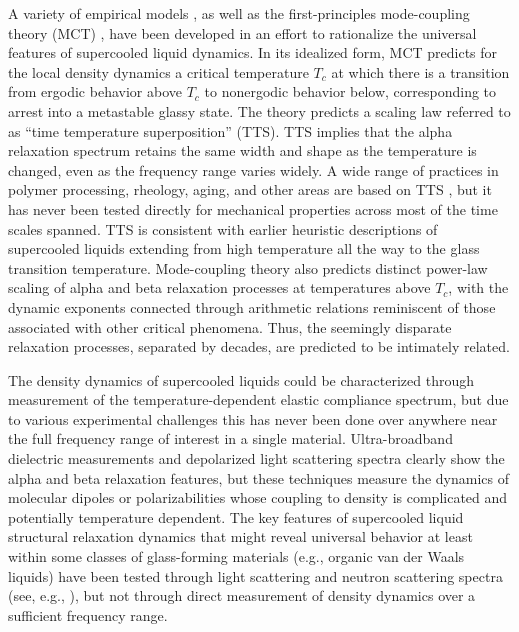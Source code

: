 \documentclass[reprint,showpacs,amsmath,amssymb,aip,jcp]{revtex4-1}
\begin{document}
A variety of empirical models \cite{Dyre2006a, Gibbs1958, Cohen1979,
  Kivelson1995, Jung2005, Tripathy2009}, as well as the
first-principles mode-coupling theory (MCT) \cite{Gotze1992,Das2004},
have been developed in an effort to rationalize the universal features
of supercooled liquid dynamics. In its idealized form, MCT predicts
for the local density dynamics a critical temperature $T_c$ at which
there is a transition from ergodic behavior above $T_c$ to nonergodic
behavior below, corresponding to arrest into a metastable glassy
state. The theory predicts a scaling law referred to as ``time
temperature superposition'' (TTS). TTS implies that the alpha
relaxation spectrum retains the same width and shape as the
temperature is changed, even as the frequency range varies widely.  A
wide range of practices in polymer processing, rheology, aging, and
other areas are based on TTS \cite{Ferry1980, Plazek1996, Olsen2001,
  Narayanaswamy1971, Moynihan1976}, but it has never been tested
directly for mechanical properties across most of the time scales
spanned. TTS is consistent with earlier heuristic descriptions of
supercooled liquids extending from high temperature all the way to the
glass transition temperature. Mode-coupling theory also predicts
distinct power-law scaling of alpha and beta relaxation processes at
temperatures above $T_c$, with the dynamic exponents connected through
arithmetic relations reminiscent of those associated with other
critical phenomena. Thus, the seemingly disparate relaxation
processes, separated by decades, are predicted to be intimately
related.

The density dynamics of supercooled liquids could be characterized
through measurement of the temperature-dependent elastic compliance
spectrum, but due to various experimental challenges this has never
been done over anywhere near the full frequency range of interest in a
single material. Ultra-broadband dielectric measurements
\cite{Lunkenheimer2000} and depolarized light scattering spectra
\cite{Petzold2010} clearly show the alpha and beta relaxation
features, but these techniques measure the dynamics of molecular
dipoles or polarizabilities whose coupling to density is complicated
and potentially temperature dependent. The key features of supercooled
liquid structural relaxation dynamics that might reveal universal
behavior at least within some classes of glass-forming materials
(e.g., organic van der Waals liquids) have been tested through light
scattering and neutron scattering spectra (see, e.g., \cite{Li1992,
  Li1992a, Gotze1999, Wuttke1994, Shen2000}), but not through direct
measurement of density dynamics over a sufficient frequency range.
\end{document}
